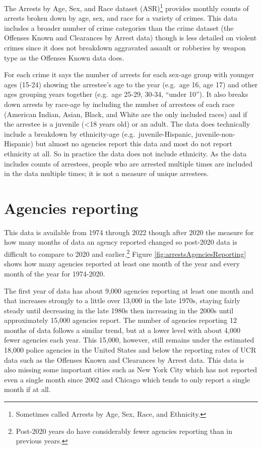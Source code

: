 \documentclass[
]{krantz}
\begin{document}
The Arrests by Age, Sex, and Race dataset (ASR)\footnote{Sometimes
  called Arrests by Age, Sex, Race, and Ethnicity.} provides
monthly counts of arrests broken down by age, sex, and race
for a variety of crimes. This data includes a broader number
of crime categories than the crime dataset (the Offenses
Known and Clearances by Arrest data) though is less detailed
on violent crimes since it does not breakdown aggravated
assault or robberies by weapon type as the Offenses Known
data does.

For each crime it says the number of arrests for each
sex-age group with younger ages (15-24) showing the
arrestee's age to the year (e.g.~age 16, age 17) and other
ages grouping years together (e.g.~age 25-29, 30-34, ``under
10''). It also breaks down arrests by race-age by including
the number of arrestees of each race (American Indian,
Asian, Black, and White are the only included races) and if
the arrestee is a juvenile (\textless18 years old) or an
adult. The data does technically include a breakdown by
ethnicity-age (e.g.~juvenile-Hispanic,
juvenile-non-Hispanic) but almost no agencies report this
data and most do not report ethnicity at all. So in practice
the data does not include ethnicity. As the data includes
counts of arrestees, people who are arrested multiple times
are included in the data multiple times; it is not a measure
of unique arrestees.

\section{Agencies reporting}\label{agencies-reporting-1}

This data is available from 1974 through 2022 though after
2020 the measure for how many months of data an agency
reported changed so post-2020 data is difficult to compare
to 2020 and earlier.\footnote{Post-2020 years do have
  considerably fewer agencies reporting than in previous
  years.} Figure \ref{fig:arrestsAgenciesReporting} shows
how many agencies reported at least one month of the year
and every month of the year for 1974-2020.

The first year of data has about 9,000 agencies reporting at
least one month and that increases strongly to a little over
13,000 in the late 1970s, staying fairly steady until
decreasing in the late 1980s then increasing in the 2000s
until approximately 15,000 agencies report. The number of
agencies reporting 12 months of data follows a similar
trend, but at a lower level with about 4,000 fewer agencies
each year. This 15,000, however, still remains under the
estimated 18,000 police agencies in the United States and
below the reporting rates of UCR data such as the Offenses
Known and Clearances by Arrest data. This data is also
missing some important cities such as New York City which
has not reported even a single month since 2002 and Chicago
which tends to only report a single month if at all.
\end{document}
